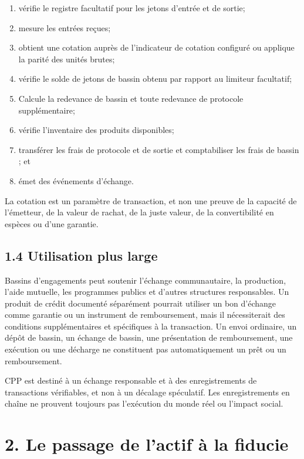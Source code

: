 \documentclass[11pt]{article}
\begin{document}
\begin{enumerate}[leftmargin=*]
\item vérifie le registre facultatif pour les jetons d'entrée et de sortie;
\item mesure les entrées reçues;
\item obtient une cotation auprès de l'indicateur de cotation configuré ou applique la parité des unités brutes;
\item vérifie le solde de jetons de bassin obtenu par rapport au limiteur facultatif;
\item Calcule la redevance de bassin et toute redevance de protocole supplémentaire;
\item vérifie l'inventaire des produits disponibles;
\item transférer les frais de protocole et de sortie et comptabiliser les frais de bassin ; et
\item émet des événements d'échange.
\end{enumerate}
La cotation est un paramètre de transaction, et non une preuve de la capacité de l'émetteur, de la valeur de rachat, de la juste valeur, de la convertibilité en espèces ou d'une garantie.

\subsection*{1.4 Utilisation plus large}

Bassins d'engagements peut soutenir l'échange communautaire, la production, l'aide mutuelle, les programmes publics et d'autres structures responsables. Un produit de crédit documenté séparément pourrait utiliser un bon d'échange comme garantie ou un instrument de remboursement, mais il nécessiterait des conditions supplémentaires et spécifiques à la transaction. Un envoi ordinaire, un dépôt de bassin, un échange de bassin, une présentation de remboursement, une exécution ou une décharge ne constituent pas automatiquement un prêt ou un remboursement.

CPP est destiné à un échange responsable et à des enregistrements de transactions vérifiables, et non à un décalage spéculatif. Les enregistrements en chaîne ne prouvent toujours pas l'exécution du monde réel ou l'impact social.


\section*{2. Le passage de l'actif à la fiducie}
\end{document}
